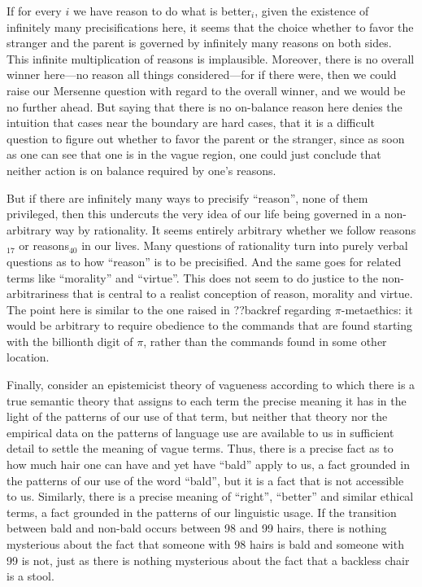 If for every $i$ we have reason to do what is better$_i$, given the existence of infinitely many precisifications here, it seems that the choice whether to
favor the stranger and the parent is governed by infinitely many reasons on both sides. This infinite multiplication of reasons is implausible. Moreover, there is no overall winner here---no reason all things considered---for if
there were, then we could raise our Mersenne question with regard to the overall winner, and we would be no further ahead. But saying that there is no on-balance reason
here denies the intuition that cases near the boundary are hard cases, that it is a difficult question to figure out whether to favor the parent or the stranger, since
as soon as one can see that one is in the vague region, one could just conclude that neither action is on balance required by one's reasons. 

But if there are infinitely many ways to precisify ``reason'', none of them privileged, then this undercuts the very idea of our life being governed in
a non-arbitrary way by rationality. It seems entirely arbitrary whether we follow reasons$_{17}$ or reasons$_{40}$ in our lives. Many questions of rationality
turn into purely verbal questions as to how ``reason'' is to be precisified. And the same goes for related terms like ``morality'' and ``virtue''. This 
does not seem to do justice to the non-arbitrariness that is central to a realist conception of reason, morality and virtue. The point here is similar to the
one raised in ??backref regarding $\pi$-metaethics: it would be arbitrary to require obedience to the commands that are found starting with the billionth digit of $\pi$,
rather than the commands found in some other location. 

Finally, consider an epistemicist theory of vagueness according to which there is a true semantic theory that assigns to each term the precise meaning it has in the
light of the patterns of our use of that term, but neither that theory nor the empirical data on the patterns of language use are available
to us in sufficient detail to settle the meaning of vague terms.  Thus, there is a precise fact as to how much hair one can have
and yet have ``bald'' apply to us, a fact grounded in the patterns of our use of the word ``bald'', but it is a fact that is not accessible to us. Similarly, there is
a precise meaning of ``right'', ``better'' and similar ethical terms, a fact grounded in the patterns of our linguistic usage. If the transition between bald and non-bald occurs
between 98 and 99 hairs, there is nothing mysterious about the fact that someone with 98 hairs is bald and someone with 99 is not, just as there is nothing mysterious
about the fact that a backless chair is a stool. 

